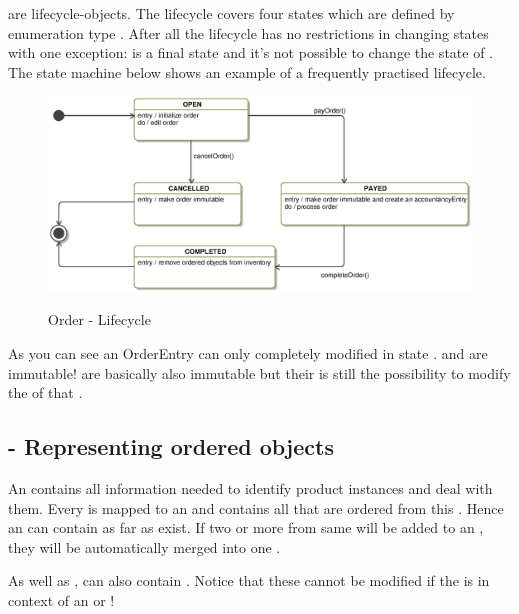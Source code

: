  are lifecycle-objects. The lifecycle covers four states which are defined by enumeration type . After all the lifecycle has no restrictions in changing states with one exception:  is a final state and it's not possible to change the state of  . The state machine below shows an example of a frequently practised lifecycle.

\begin{figure}[ht]
	\centering
  \includegraphics[width=1.0\textwidth]{images/Order_StateMachine.eps}
	\label{order_statemachine}
	\caption{Order - Lifecycle}
\end{figure}  

As you can see an OrderEntry can only completely modified in state .  and   are immutable!   are basically also immutable but their is still the possibility to modify the  of that . 

\subsection{ - Representing ordered objects}
An  contains all information needed to identify product instances and deal with them. Every  is mapped to an  and contains all  that are ordered from this . Hence an  can contain as far  as  exist. If two or more  from same  will be added to an , they will be automatically merged into one .

As well as ,  can also contain . Notice that these  cannot be modified if the  is in context of an  or  ! 

